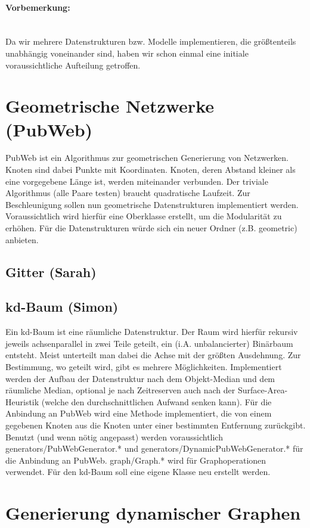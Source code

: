 \documentclass{scrartcl}
\begin{document}
\paragraph*{Vorbemerkung:}~\\
Da wir mehrere Datenstrukturen bzw. Modelle implementieren, die größtenteils unabhängig voneinander sind, haben wir schon einmal eine initiale voraussichtliche Aufteilung getroffen.
\section{Geometrische Netzwerke (PubWeb)}
PubWeb ist ein Algorithmus zur geometrischen Generierung von Netzwerken. Knoten sind dabei Punkte mit Koordinaten. Knoten, deren Abstand kleiner als eine vorgegebene Länge ist, werden miteinander verbunden. Der triviale Algorithmus (alle Paare testen) braucht quadratische Laufzeit. Zur Beschleunigung sollen nun geometrische Datenstrukturen implementiert werden. Voraussichtlich wird hierfür eine Oberklasse erstellt, um die Modularität zu erhöhen. Für die Datenstrukturen würde sich ein neuer Ordner (z.B. geometric) anbieten.
\subsection{Gitter (Sarah)}

\subsection{kd-Baum (Simon)}
Ein kd-Baum ist eine räumliche Datenstruktur. Der Raum wird hierfür rekursiv jeweils achsenparallel in zwei Teile geteilt, ein (i.A. unbalancierter) Binärbaum entsteht. Meist unterteilt man dabei die Achse mit der größten Ausdehnung. Zur Bestimmung, wo geteilt wird, gibt es mehrere Möglichkeiten. Implementiert werden der Aufbau der Datenstruktur nach dem Objekt-Median und dem räumliche Median, optional je nach Zeitreserven auch nach der Surface-Area-Heuristik (welche den durchschnittlichen Aufwand senken kann). Für die Anbindung an PubWeb wird eine Methode implementiert, die von einem gegebenen Knoten aus die Knoten unter einer bestimmten Entfernung zurückgibt.\\
Benutzt (und wenn nötig angepasst) werden voraussichtlich generators/PubWebGenerator.* und generators/DynamicPubWebGenerator.* für die Anbindung an PubWeb. graph/Graph.* wird für Graphoperationen verwendet. Für den kd-Baum soll eine eigene Klasse neu erstellt werden.

\section{Generierung dynamischer Graphen}
\end{document}
